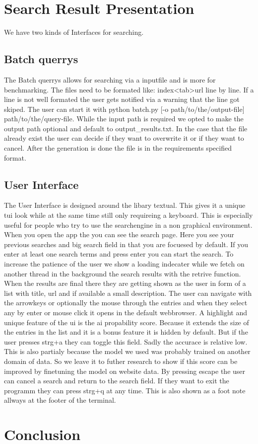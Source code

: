 \section{Search Result Presentation}
We have two kinds of Interfaces for searching.
\subsection{Batch querrys}
The Batch querrys allows for searching via a inputfile and is more for benchmarking. The files need to be formated like: index<tab>url line by line. If a line is not well formated the user gets notified via a warning that the line got skiped. The user can start it with python batch.py [-o path/to/the/output-file] path/to/the/query-file. While the input path is required we opted to make the output path optional and default to output\_results.txt. In the case that the file already exist the user can decide if they want to overwrite it or if they want to cancel. After the generation is done the file is in the requirements specified format.
\subsection{User Interface}
The User Interface is designed around the libary textual. This gives it a unique tui look while at the same time still only requireing a keyboard. This is especially useful for people who try to use the searchengine in a non graphical environment. When you open the app the you can see the search page. Here you see your previous searches and big search field in that you are focuesed by default. If you enter at least one search terms and press enter you can start the search. To increase the patience of the user we show a loading indecater while we fetch on another thread in the background the search results with the retrive function. When the results are final there they are getting shown as the user in form of a list with title, url and if available a small description. The user can navigate with the arrowkeys or optionally the mouse through the entries and when they select any by enter or mouse click it opens in the default webbrowser.
A highlight and unique feature of the ui is the ai propability score. Because it extends the size of the entries in the list and it is a bonus feature it is hidden by default. But if the user presses strg+a they can toggle this field. Sadly the accurace is relative low. This is also partialy because the model we used was probably trained on another domain of data. So we leave it to futher research to show if this score can be improved by finetuning the model on website data. 
By pressing escape the user can cancel a search and return to the search field. If they want to exit the programm they can press strg+q at any time. This is also shown as a foot note allways at the footer of the terminal.

\section{Conclusion}